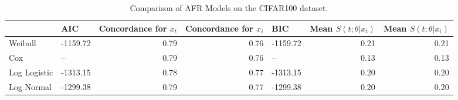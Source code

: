 \begin{table}
\caption{Comparison of AFR Models on the CIFAR100 dataset.}
\label{tab:cifar100}
\begin{tabular}{llrrlrr}
\toprule
 & AIC & Concordance for $x_t$ & Concordance for $x_i$ & BIC & Mean $S(t;\theta|x_{t})$ & Mean $S(t;\theta|x_{i})$ \\
\midrule
Weibull & -1159.72 & 0.79 & 0.76 & -1159.72 & 0.21 & 0.21 \\
Cox & -- & 0.79 & 0.76 & -- & 0.13 & 0.13 \\
Log Logistic & -1313.15 & 0.78 & 0.77 & -1313.15 & 0.20 & 0.20 \\
Log Normal & -1299.38 & 0.79 & 0.77 & -1299.38 & 0.20 & 0.20 \\
\bottomrule
\end{tabular}
\end{table}
